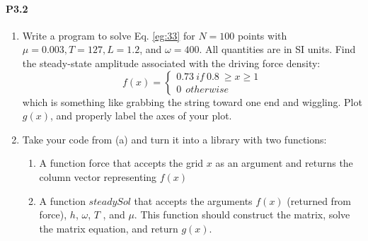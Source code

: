 \documentclass{book}
\theoremstyle{plain}
\theoremstyle{definition}
\numberwithin{exm}{chapter}
\theoremstyle{remark}
\theoremstyle{summary}
\theoremstyle{overview}
\begin{document}
\paragraph*{P3.2}
\begin{enumerate}[label=(\alph*)]
	\item Write a program to solve Eq. \eqref{eg:33} for $N = 100$ points with $ \mu = 0.003,
T = 127, L = 1.2$, and $\omega = 400$. All quantities are in SI units. Find the
steady-state amplitude associated with the driving force density:
\begin{equation}\label{eq:34}
		f(x) = 
		\begin{cases}
		0.73 \ if \ 0.8 \	\geq x 	\geq 1 \\
		0 \ \ otherwise
		\end{cases}
				\end{equation}which is something like grabbing the string toward one end and wiggling. Plot $g(x)$, and properly label the axes of your plot.
				\item Take your code from (a) and turn it into a library with two functions:
				\begin{enumerate}
				\item	A function force that accepts the grid $x$ as an argument and
returns the column vector representing $f(x)$

\item A function $steadySol$ that accepts the arguments $f(x)$ (returned
from force), $h$, $\omega$, $T$ , and $\mu$. This function should construct the
matrix, solve the matrix equation, and return $g(x)$.
\end{enumerate}


\end{enumerate}
\end{document}
